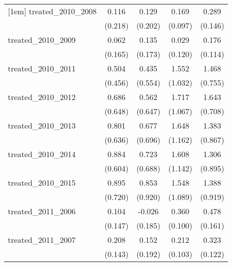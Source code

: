 {\begin{tabular}{l*{4}{c}}
[1em]
treated\_2010\_2008&       0.116         &       0.129         &       0.169         &       0.289\sym{*}  \\
            &     (0.218)         &     (0.202)         &     (0.097)         &     (0.146)         \\
[1em]
treated\_2010\_2009&       0.062         &       0.135         &       0.029         &       0.176         \\
            &     (0.165)         &     (0.173)         &     (0.120)         &     (0.114)         \\
[1em]
treated\_2010\_2011&       0.504         &       0.435         &       1.552         &       1.468         \\
            &     (0.456)         &     (0.554)         &     (1.032)         &     (0.755)         \\
[1em]
treated\_2010\_2012&       0.686         &       0.562         &       1.717         &       1.643\sym{*}  \\
            &     (0.648)         &     (0.647)         &     (1.067)         &     (0.708)         \\
[1em]
treated\_2010\_2013&       0.801         &       0.677         &       1.648         &       1.383         \\
            &     (0.636)         &     (0.696)         &     (1.162)         &     (0.867)         \\
[1em]
treated\_2010\_2014&       0.884         &       0.723         &       1.608         &       1.306         \\
            &     (0.604)         &     (0.688)         &     (1.142)         &     (0.895)         \\
[1em]
treated\_2010\_2015&       0.895         &       0.853         &       1.548         &       1.388         \\
            &     (0.720)         &     (0.920)         &     (1.089)         &     (0.919)         \\
[1em]
treated\_2011\_2006&       0.104         &      -0.026         &       0.360\sym{***}&       0.478\sym{**} \\
            &     (0.147)         &     (0.185)         &     (0.100)         &     (0.161)         \\
[1em]
treated\_2011\_2007&       0.208         &       0.152         &       0.212\sym{*}  &       0.323\sym{**} \\
            &     (0.143)         &     (0.192)         &     (0.103)         &     (0.122)         \\

\end{tabular}}
